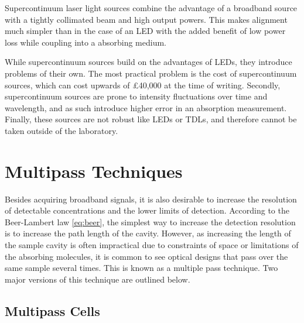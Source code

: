 Supercontinuum laser light sources combine the advantage of a broadband source
with a tightly collimated beam and high output powers. This makes alignment
much simpler than in the case of an \ac{LED} with the added benefit of low
power loss while coupling into a absorbing medium.



While supercontinuum sources build on the advantages of \acp{LED}, they
introduce problems of their own. The most practical problem is the cost of
supercontinuum sources, which can cost upwards of \pounds40,000 at the time of
writing. Secondly, supercontinuum sources are prone to intensity fluctuations
over time and wavelength, and as such introduce higher error in an absorption
measurement.  Finally, these sources are not robust like \acp{LED} or
\acp{TDL}, and therefore cannot be taken outside of the laboratory.



\section{Multipass Techniques}\label{sec:multipass}

Besides acquiring broadband signals, it is also desirable to increase the
resolution of detectable concentrations and the lower limits of detection.
According to the Beer-Lambert law \eqref{eq:beer}, the simplest way to increase
the detection resolution is to increase the path length of the cavity. However,
as increasing the length of the sample cavity is often impractical due to
constraints of space or limitations of the absorbing molecules, it is common to
see optical designs that pass over the same sample several times. This is known
as a multiple pass technique. Two major versions of this technique are outlined
below.



\subsection{Multipass Cells}\label{subsec:herriott}



